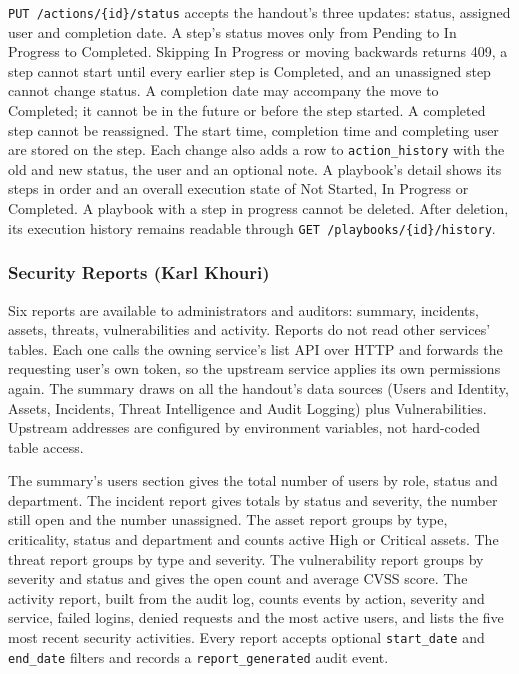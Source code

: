\texttt{PUT /actions/\{id\}/status} accepts the handout's three updates: status, assigned user and completion date. A step's status moves only from Pending to In Progress to Completed. Skipping In Progress or moving backwards returns 409, a step cannot start until every earlier step is Completed, and an unassigned step cannot change status. A completion date may accompany the move to Completed; it cannot be in the future or before the step started. A completed step cannot be reassigned. The start time, completion time and completing user are stored on the step. Each change also adds a row to \texttt{action\_history} with the old and new status, the user and an optional note. A playbook's detail shows its steps in order and an overall execution state of Not Started, In Progress or Completed. A playbook with a step in progress cannot be deleted. After deletion, its execution history remains readable through \texttt{GET /playbooks/\{id\}/history}.

\subsubsection{Security Reports (Karl Khouri)}

Six reports are available to administrators and auditors: summary, incidents, assets, threats, vulnerabilities and activity. Reports do not read other services' tables. Each one calls the owning service's list API over HTTP and forwards the requesting user's own token, so the upstream service applies its own permissions again. The summary draws on all the handout's data sources (Users and Identity, Assets, Incidents, Threat Intelligence and Audit Logging) plus Vulnerabilities. Upstream addresses are configured by environment variables, not hard-coded table access.

The summary's users section gives the total number of users by role, status and department. The incident report gives totals by status and severity, the number still open and the number unassigned. The asset report groups by type, criticality, status and department and counts active High or Critical assets. The threat report groups by type and severity. The vulnerability report groups by severity and status and gives the open count and average CVSS score. The activity report, built from the audit log, counts events by action, severity and service, failed logins, denied requests and the most active users, and lists the five most recent security activities. Every report accepts optional \texttt{start\_date} and \texttt{end\_date} filters and records a \texttt{report\_generated} audit event.

